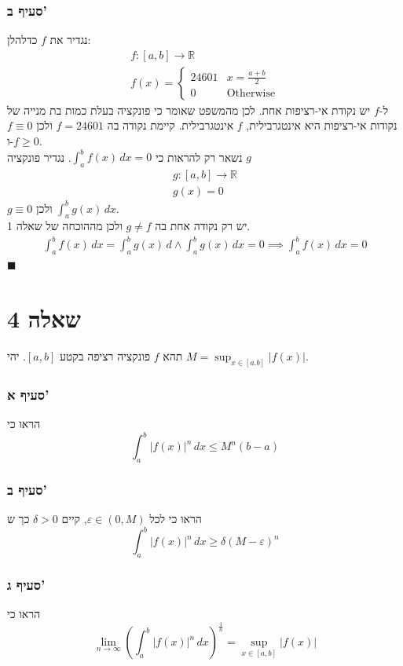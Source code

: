 \documentclass[12pt, titlepage]{article}
\begin{document}
\section*{סעיף ב'}
נגדיר את $f$ כדלהלן:
\begin{gather*}
	f:\left[ a,b \right] \to \mathbb{R} \\
	f\left( x \right) =\begin{cases}
	24601 & x= \frac{a+b}{2} \\
	0 & \text{Otherwise}
	\end{cases}
\end{gather*}
ל-$f$ יש נקודת אי-רציפות אחת. לכן מהמשפט שאומר כי פונקציה בעלת כמות בת מנייה של נקודות אי-רציפות היא אינטגרבילית, $f$ אינטגרבילית. קיימת נקודה בה $f= 24601$  ולכן $f\equiv 0$ ו-$f\geq 0$.\\
נשאר רק להראות כי $\int_{a}^{b} f\left( x \right) \, dx=0$. נגדיר פונקציה $g$ 
\begin{gather*}
	g:\left[ a,b \right] \to \mathbb{R} \\
	g\left( x \right) =0
\end{gather*}
$g\equiv 0$ ולכן $\int_{a}^{b} g\left( x \right) \, dx$.\\
יש רק נקודה אחת בה $g\neq f$ ולכן מההוכחה של שאלה 1.
\begin{gather*}
	\int_{a}^{b} f\left( x \right)  \, dx =\int_{a}^{b} g\left( x \right)  \, d\land \int_{a}^{b} g\left( x \right)  \, dx =0 \implies \boxed{\int_{a}^{b} f\left( x \right)  \, dx =0} 
\end{gather*}
$\blacksquare$
\part*{שאלה 4}
תהא $f$ פונקציה רציפה בקטע $\left[ a,b \right]$. יהי $M=\sup_{x \in \left[ a.b \right]}\left| f\left( x \right) \right|$.
\section*{סעיף א'}
הראו כי 
$$
	\int_{a}^{b} \left| f\left( x \right)  \right|^{n}  \, dx \leq M^{n}\left( b-a \right) 
$$
\section*{סעיף ב'}
הראו כי לכל $\varepsilon \in \left( 0,M \right)$, קיים $\delta>0$ כך ש
$$
\int_{a}^{b} \left| f\left( x \right)  \right| ^{n} \, dx  \geq \delta \left( M-\varepsilon \right) ^{n}
$$
\section*{סעיף ג'}
הראו כי
$$
\lim_{ n \to \infty } \left( \int_{a}^{b} \left| f\left( x \right)  \right| ^{n} \, dx  \right) ^{\frac{1}{n}}=\underset{ x \in \left[ a,b \right]  }{ \sup }\left| f\left( x \right)  \right| 
$$
\end{document}
